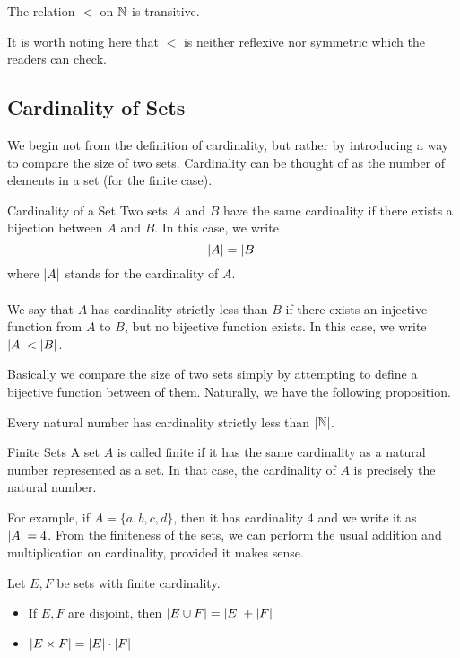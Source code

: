 \documentclass[a4paper]{article}
\begin{document}
\begin{prp}{}{} The relation $<$ on $\mathbb{N}$ is transitive. 
\end{prp}

It is worth noting here that $<$ is neither reflexive nor symmetric which the readers can check. 

\subsection{Cardinality of Sets}
We begin not from the definition of cardinality, but rather by introducing a way to compare the size of two sets. Cardinality can be thought of as the number of elements in a set (for the finite case). 

\begin{defn}{Cardinality of a Set}{} Two sets $A$ and $B$ have the same cardinality if there exists a bijection between $A$ and $B$. In this case, we write $$\abs{A}=\abs{B}$$ where $\abs{A}$ stands for the cardinality of $A$. \\~\\
We say that $A$ has cardinality strictly less than $B$ if there exists an injective function from $A$ to $B$, but no bijective function exists. In this case, we write $\abs{A}<\abs{B}$. 
\end{defn}

Basically we compare the size of two sets simply by attempting to define a bijective function between of them. Naturally, we have the following proposition. 

\begin{prp}{}{} Every natural number has cardinality strictly less than $\abs{\mathbb{N}}$. 
\end{prp}

\begin{defn}{Finite Sets}{} A set $A$ is called finite if it has the same cardinality as a natural number represented as a set. In that case, the cardinality of $A$ is precisely the natural number. 
\end{defn}

For example, if $A=\{a,b,c,d\}$, then it has cardinality $4$ and we write it as $\abs{A}=4$. From the finiteness of the sets, we can perform the usual addition and multiplication on cardinality, provided it makes sense. 

\begin{prp}{}{} Let $E,F$ be sets with finite cardinality. 
\begin{itemize}
\item If $E,F$ are disjoint, then $\abs{E\cup F}=\abs{E}+\abs{F}$
\item $\abs{E\times F}=\abs{E}\cdot\abs{F}$
\end{itemize}
\end{prp}
\end{document}
